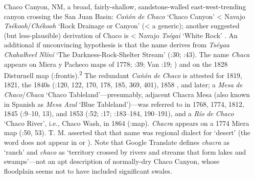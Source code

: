 Chaco Canyon, NM, a broad, fairly-shallow, sandstone-walled east-west-trending canyon crossing the San Juan Basin:  \textit{Cañón} \textit{de} \textit{Chaco} ‘Chaco Canyon’ < Navajo \textit{Tsékooh}/\textit{Chékooh} ‘Rock Drainage or Canyon’ (< a generic); another suggested (but less-plausible) derivation of Chaco is < Navajo \textit{Tségai} ‘White Rock’ \citep[1]{Brugge1986}.  An additional if unconvincing hypothesis is that the name derives from \textit{Tséyaa} \textit{Chahałheeł} \textit{Nlíní} ‘The Darkness-Rock-Shelter Stream’ (\citealt{Pearce1965}:30; \citealt{Linford2005}:43).  The name \textit{Chaca} appears on Miera y Pacheco maps of 1778; \citealt{Kessell2013}:39; Van \citealt{Valkenburgh1999}:19; \citealt{Briggs1976}) and on the 1828 Disturnell map (\citealt{Tyler1985}:frontis).\textsuperscript{2}  The redundant \textit{Cañón} \textit{de} \textit{Chaco} is attested for 1819, 1821, the 1840s (\citealt{Correll1979}:120, 122, 170, 178, 185, 369, 401), 1858 \citep[14]{Brugge1980}, and later; a \textit{Mesa} \textit{de} \textit{Chaco}/\textit{Chaca} ‘Chaco Tableland’—presumably, adjacent Chacra Mesa (also known in Spanish as \textit{Mesa} \textit{Azul} ‘Blue Tableland’)—was referred to in 1768, 1774, 1812, 1845 (\citealt{Brugge1980}:9–10, 13), and 1853 (\citealt{Bailey1964b}:52; \citealt{Brugge1965}:17; \citealt{Linford2000}:183–184, 190–191), and a \textit{Río} \textit{de} \textit{Chaco} ‘Chaco River’, i.e., Chaco Wash, in 1864 (\citealt{Madsen2010}:map).  \textit{Chacra} appears on a 1774 Miera map (\citealt{Eidenbach2012}:50, 53).  T. M. \citet[30]{Pearce1965} asserted that that name was regional dialect for ‘desert’ (the word does not appear in \citealt{Cobos1983} or \citealt{BillsVigil2008}).  Note that Google Translate defines \textit{chacra} as ‘ranch’ and \textit{chaco} as ‘territory crossed by rivers and streams that form lakes and swamps’—not an apt description of normally-dry Chaco Canyon, whose floodplain seems not to have included significant swales.

